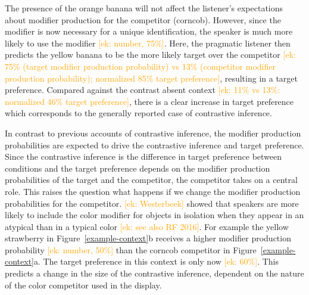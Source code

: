 \documentclass[10pt,letterpaper]{article}
\newcommand{\ek}[1]{\textcolor{Orange}{[ek: #1]}}
\begin{document}
The presence of the orange banana will not affect the listener's expectations about modifier production for the competitor (corncob). However, since the modifier is now necessary for a unique identification, the speaker is much more likely to use the modifier \ek{number, 75\%}. Here, the pragmatic listener then predicts the yellow banana to be the more likely target over the competitor \ek{75\% (target modifier production probability) vs 13\% (competitor modifier production probability); normalized 85\% target preference}, resulting in a target preference. Compared against the contrast absent context \ek{11\% vs 13\%: normalized 46\% target preference}, there is a clear increase in target preference which corresponds to the generally reported case of contrastive inference.

In contrast to previous accounts of contrastive inference, the modifier production probabilities are expected to drive the contrastive inference and target preference. Since the contrastive inference is the difference in target preference between conditions and the target preference depends on the modifier production probabilities of the target and the competitor, the competitor takes on a central role. This raises the question what happens if we change the modifier production probabilities for the competitor. \ek{Westerbeek} showed that speakers are more likely to include the color modifier for objects in isolation when they appear in an atypical than in a typical color \ek{see also RF 2016}. For example the yellow strawberry in Figure~\ref{example-context}b receives a higher modifier production probability \ek{number, 50\%} than the corncob competitor in Figure~\ref{example-context}a. The target preference in this context is only now \ek{60\%}. This predicts a change in the size of the contrastive inference, dependent on the nature of the color competitor used in the display.


\end{document}
